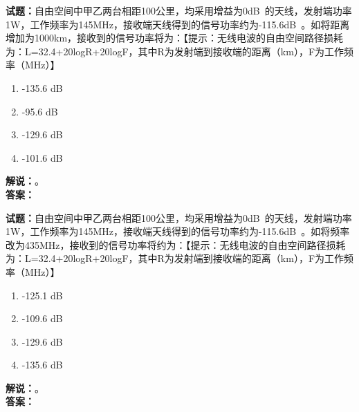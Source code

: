 \documentclass{ctexbook}
\begin{document}
\vspace{\baselineskip}

\noindent\textbf{试题：}自由空间中甲乙两台相距100公里，均采用增益为0\unit[qualifier-mode=combine]{\deci\bel{}}的天线，发射端功率1W，工作频率为145\unit{\MHz}，接收端天线得到的信号功率约为-115.6\unit[qualifier-mode=combine]{\deci\bel{}}。如将距离增加为1000km，接收到的信号功率将为：【提示：无线电波的自由空间路径损耗为：L=32.4+20logR+20logF，其中R为发射端到接收端的距离（km），F为工作频率（\unit{\MHz}）】
\begin{enumerate}[leftmargin=3em]
  \item -135.6 \unit[qualifier-mode=combine]{\deci\bel{}}
  \item -95.6 \unit[qualifier-mode=combine]{\deci\bel{}}
  \item -129.6 \unit[qualifier-mode=combine]{\deci\bel{}}
  \item -101.6 \unit[qualifier-mode=combine]{\deci\bel{}}
\end{enumerate}
\noindent\textbf{解说：}\textbf{}。\\\noindent\textbf{答案：}

\vspace{\baselineskip}

\noindent\textbf{试题：}自由空间中甲乙两台相距100公里，均采用增益为0\unit[qualifier-mode=combine]{\deci\bel{}}的天线，发射端功率1W，工作频率为145\unit{\MHz}，接收端天线得到的信号功率约为-115.6\unit[qualifier-mode=combine]{\deci\bel{}}。如将频率改为435\unit{\MHz}，接收到的信号功率将约为：【提示：无线电波的自由空间路径损耗为：L=32.4+20logR+20logF，其中R为发射端到接收端的距离（km），F为工作频率（\unit{\MHz}）】
\begin{enumerate}[leftmargin=3em]
  \item -125.1 \unit[qualifier-mode=combine]{\deci\bel{}}
  \item -109.6 \unit[qualifier-mode=combine]{\deci\bel{}}
  \item -129.6 \unit[qualifier-mode=combine]{\deci\bel{}}
  \item -135.6 \unit[qualifier-mode=combine]{\deci\bel{}}
\end{enumerate}
\noindent\textbf{解说：}\textbf{}。\\\noindent\textbf{答案：}

\vspace{\baselineskip}
\end{document}
